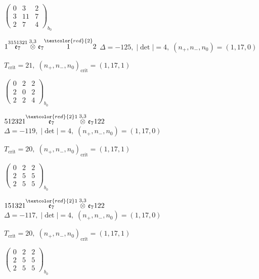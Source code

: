 \documentclass[10pt]{article}
\begin{document}
\hspace{2em}$\left(\begin{smallmatrix}0 & 3 & 2 \\ 3 & 11 & 7 \\ 2 & 7 & 4\end{smallmatrix}\right)_{\!b_0}$

$1\overset{3151321}{\mathfrak{e}_7}\overset{3,3}{\otimes}\mathfrak{e}_7\overset{\textcolor{red}{2}}{1}2$ \quad $\Delta=-125,\; |\det|=4,\; (n_+,n_-,n_0)=(1,17,0)$

\hspace{1em}$T_{\text{crit}}=21,\; (n_+,n_-,n_0)_{\text{crit}}=(1,17,1)$

\hspace{2em}$\left(\begin{smallmatrix}0 & 2 & 2 \\ 2 & 0 & 2 \\ 2 & 2 & 4\end{smallmatrix}\right)_{\!b_0}$

\smallskip

$512321\overset{\textcolor{red}{2}1}{\mathfrak{e}_7}\overset{3,3}{\otimes}\mathfrak{e}_7122$ \quad $\Delta=-119,\; |\det|=4,\; (n_+,n_-,n_0)=(1,17,0)$

\hspace{1em}$T_{\text{crit}}=20,\; (n_+,n_-,n_0)_{\text{crit}}=(1,17,1)$

\hspace{2em}$\left(\begin{smallmatrix}0 & 2 & 2 \\ 2 & 5 & 5 \\ 2 & 5 & 5\end{smallmatrix}\right)_{\!b_0}$

\smallskip

$151321\overset{\textcolor{red}{2}1}{\mathfrak{e}_7}\overset{3,3}{\otimes}\mathfrak{e}_7122$ \quad $\Delta=-117,\; |\det|=4,\; (n_+,n_-,n_0)=(1,17,0)$

\hspace{1em}$T_{\text{crit}}=20,\; (n_+,n_-,n_0)_{\text{crit}}=(1,17,1)$

\hspace{2em}$\left(\begin{smallmatrix}0 & 2 & 2 \\ 2 & 5 & 5 \\ 2 & 5 & 5\end{smallmatrix}\right)_{\!b_0}$
\end{document}

